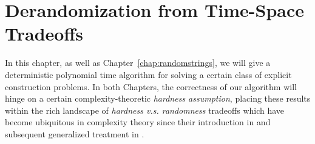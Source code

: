 \section{Derandomization from Time-Space Tradeoffs}

In this chapter, as well as Chapter~\ref{chap:randomstrings}, we will give a deterministic polynomial time algorithm for solving a certain class of explicit construction problems. In both Chapters, the correctness of our algorithm will hinge on a certain complexity-theoretic \emph{hardness assumption}, placing these results within the rich landscape of \emph{hardness v.s. randomness} tradeoffs which have become ubiquitous in complexity theory since their introduction in \cite{Yao} and subsequent generalized treatment in \cite{NW, IW} .

